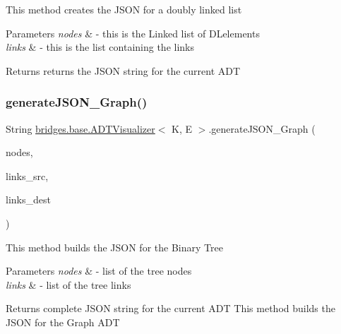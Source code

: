 This method creates the J\+S\+ON for a doubly linked list 
\begin{DoxyParams}{Parameters}
{\em nodes} & -\/ this is the Linked list of D\+Lelements \\
\hline
{\em links} & -\/ this is the list containing the links \\
\hline
\end{DoxyParams}
\begin{DoxyReturn}{Returns}
returns the J\+S\+ON string for the current A\+DT 
\end{DoxyReturn}
\hypertarget{classbridges_1_1base_1_1_a_d_t_visualizer_aabf7cbfbed0cd28b365206281176834b}{}\label{classbridges_1_1base_1_1_a_d_t_visualizer_aabf7cbfbed0cd28b365206281176834b} 
\subsubsection{\texorpdfstring{generate\+J\+S\+O\+N\+\_\+\+Graph()}{generateJSON\_Graph()}}
{\footnotesize\ttfamily String \hyperlink{classbridges_1_1base_1_1_a_d_t_visualizer}{bridges.\+base.\+A\+D\+T\+Visualizer}$<$ K, E $>$.generate\+J\+S\+O\+N\+\_\+\+Graph (\begin{DoxyParamCaption}\item[{Linked\+List$<$ \hyperlink{classbridges_1_1base_1_1_element}{Element}$<$ E $>$$>$}]{nodes,  }\item[{Linked\+List$<$ \hyperlink{classbridges_1_1base_1_1_element}{Element}$<$ E $>$$>$}]{links\+\_\+src,  }\item[{Linked\+List$<$ \hyperlink{classbridges_1_1base_1_1_element}{Element}$<$ E $>$$>$}]{links\+\_\+dest }\end{DoxyParamCaption})}

This method builds the J\+S\+ON for the Binary Tree 
\begin{DoxyParams}{Parameters}
{\em nodes} & -\/ list of the tree nodes \\
\hline
{\em links} & -\/ list of the tree links \\
\hline
\end{DoxyParams}
\begin{DoxyReturn}{Returns}
complete J\+S\+ON string for the current A\+DT This method builds the J\+S\+ON for the Graph A\+DT 
\end{DoxyReturn}

